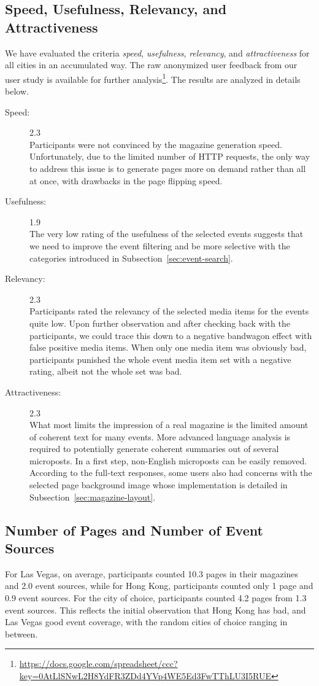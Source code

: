 \documentclass[runningheads,a4paper]{llncs}
\begin{document}
{\subsection{Speed, Usefulness, Relevancy, and Attractiveness}
We have evaluated the criteria \emph{speed}, \emph{usefulness}, \emph{relevancy}, and \emph{attractiveness} for all cities in an accumulated way. The raw anonymized user feedback from our user study is available for further analysis\footnote{\url{https://docs.google.com/spreadsheet/ccc?key=0AtLlSNwL2H8YdFR3ZDd4YVp4WE5Ed3FwTThLU3I5RUE}}.
The results are analyzed in details below.
\begin{description}
  \item[Speed:] 2.3\\
  Participants were not convinced by the magazine generation speed. Unfortunately, due to the limited number of HTTP requests, the only way to address this issue is to generate pages more on demand rather than all at once, with drawbacks in the page flipping speed.
  \item[Usefulness:] 1.9\\
  The very low rating of the usefulness of the selected events suggests that we need to improve the event filtering and be more selective with the categories introduced in Subsection~\ref{sec:event-search}.
  \item[Relevancy:] 2.3\\
  Participants rated the relevancy of the selected media items for the events quite low. Upon further observation and after checking back with the participants, we could trace this down to a negative bandwagon effect with false positive media items. When only one media item was obviously bad, participants punished the whole event media item set with a negative rating, albeit not the whole set was bad.
  \item[Attractiveness:] 2.3\\
  What most limits the impression of a real magazine is the limited amount of coherent text for many events. More advanced language analysis is required
  to potentially generate coherent summaries out of several microposts. In a first step, non-English microposts can be easily removed. According to the full-text responses, some users also had concerns with the selected page background image whose implementation is detailed in Subsection~\ref{sec:magazine-layout}.
\end{description}

\subsection{Number of Pages and Number of Event Sources}
For Las Vegas, on average, participants counted 10.3 pages in their magazines and 2.0 event sources, while for Hong Kong, participants counted only 1 page and 0.9 event sources. For the city of choice, participants counted 4.2 pages from 1.3 event sources. This reflects the initial observation that Hong Kong has bad, and Las Vegas good event coverage, with the random cities of choice ranging in between.

}
\end{document}
